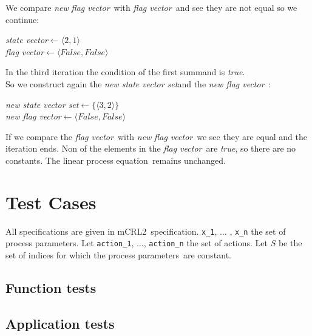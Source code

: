 \documentclass[a4paper,10pt]{article}
\newcommand{\lpe}{linear process equation}
\newcommand{\mcrl}{mCRL2}
\newcommand{\pps}{process parameters}
\newcommand{\ti}{\textit}
\newcommand{\sv}{\textit{state vector}}
\newcommand{\fv}{\textit{flag vector}}
\newcommand{\svs}{\textit{new state vector set}}
\newcommand{\nfv}{\textit{new flag vector}}
\newcommand{\la}{$\leftarrow$}
\begin{document}
We compare \ti{new} \fv\ with \fv\ and see they are not equal so we continue:
\begin{center}\begin{minipage}{250pt}
\sv \la $\langle 2 , 1 \rangle $\\
\fv \la $\langle False , False \rangle $\\
\end{minipage}\end{center}

In the third iteration the condition of the first summand is \ti{true}.\\
So we construct again the \svs and the \nfv\ : 
\begin{center}\begin{minipage}{250pt}
\svs \la  $\lbrace \langle 3 , 2 \rangle \rbrace $\\
\nfv \la  $\langle False , False \rangle $ \\
\end{minipage}\end{center}

If we compare the \fv\ with \ti{new} \fv\ we see they are equal and the iteration ends.
Non of the elements in the \fv\ are \ti{true}, so there are no constants. The \lpe\ remains unchanged.

\section{Test Cases}
All specifications are given in \mcrl\ specification.
\verb"x_1", $\ldots$ , \verb"x_n" the set of process parameters.
Let \verb"action_1", $\ldots$, \verb "action_n" the set of actions.
Let $S$ be the set of indices for which the \pps\ are constant. 

\subsection{Function tests}

\subsection{Application tests}
\end{document}
